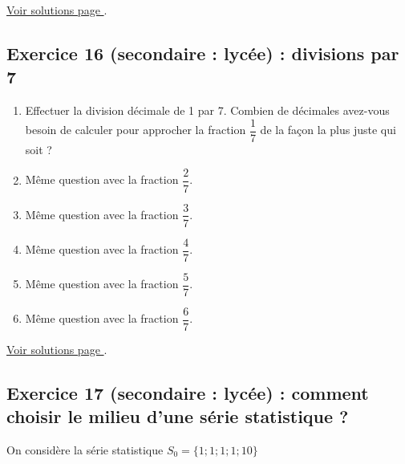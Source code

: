 \hyperref[sol:niveau15]{Voir solutions page \pageref{sol:niveau15}}.

\newpage

\subsection{Exercice 16 (secondaire : lycée) : divisions par 7}

\label{calc:niveau16}

\begin{enumerate}[label=C\arabic*)]
	\item Effectuer la division décimale de 1 par 7. Combien de décimales avez-vous besoin de calculer pour approcher la fraction $\dfrac{1}{7}$ de la façon la plus juste qui soit ?
	\item Même question avec la fraction $\dfrac{2}{7}$.
	\item Même question avec la fraction $\dfrac{3}{7}$.
	\item Même question avec la fraction $\dfrac{4}{7}$.
	\item Même question avec la fraction $\dfrac{5}{7}$.
	\item Même question avec la fraction $\dfrac{6}{7}$.
\end{enumerate}

\hyperref[sol:niveau16]{Voir solutions page \pageref{sol:niveau16}}.


\newpage

\subsection{Exercice 17 (secondaire : lycée) : comment choisir le milieu d'une série statistique ?}

\label{calc:niveau17}

On considère la série statistique $S_0 = \{1 ; 1 ; 1 ; 1 ; 10\}$

